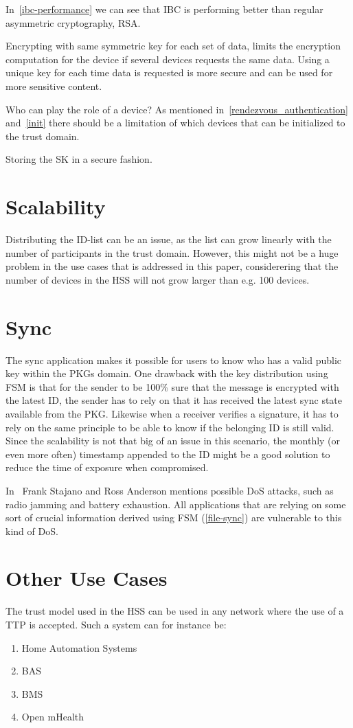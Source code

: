 In~\autoref{ibc-performance} we can see that \gls{IBC} is performing better than regular asymmetric cryptography, RSA. 

Encrypting with same symmetric key for each set of data, limits the encryption computation for the device if several devices requests the same data.
Using a unique key for each time data is requested is more secure and can be used for more sensitive content.

Who can play the role of a device?
As mentioned in~\autoref{rendezvous_authentication} and~\autoref{init} there should be a limitation of which devices that can be initialized to the trust domain.

Storing the \gls{SK} in a secure fashion.

\section{Scalability}
Distributing the \gls{ID}-list can be an issue, as the list can grow linearly with the number of participants in the trust domain.
However, this might not be a huge problem in the use cases that is addressed in this paper, considerering that the number of devices in the \gls{HSS} will not grow larger than e.g. 100 devices. 

\section{Sync}
The sync application makes it possible for users to know who has a valid public key within the \gls{PKG}s domain.
One drawback with the key distribution using \gls{FSM} is that for the sender to be 100\% sure that the message is encrypted with the latest \gls{ID}, the sender has to rely on that it has received the latest sync state available from the \gls{PKG}.
Likewise when a receiver verifies a signature, it has to rely on the same principle to be able to know if the belonging \gls{ID} is still valid.
Since the scalability is not that big of an issue in this scenario, the monthly (or even more often) timestamp appended to the \gls{ID} might be a good solution to reduce the time of exposure when compromised.

In~\cite{DBLP:conf/spw/StajanoA99} Frank Stajano and Ross Anderson mentions possible \gls{DoS} attacks, such as radio jamming and battery exhaustion. 
All applications that are relying on some sort of crucial information derived using \gls{FSM} (\autoref{file-sync}) are vulnerable to this kind of \gls{DoS}.

\section{Other Use Cases}
The trust model used in the \gls{HSS} can be used in any network where the use of a \gls{TTP} is accepted. 
Such a system can for instance be:
\begin{enumerate}
	\item Home Automation Systems
	\item \gls{BAS}
	\item \gls{BMS}
	\item Open mHealth
\end{enumerate}


